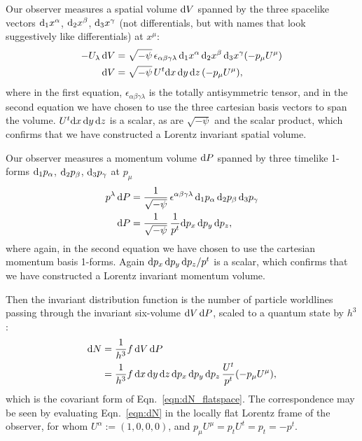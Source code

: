 Our observer measures a spatial
volume $\mathrm{d} V$ spanned by the three spacelike vectors
$\mathrm{d}_1x^\alpha$, $\mathrm{d}_2x^\beta$, $\mathrm{d}_3x^\gamma$
(not differentials, but with names that look suggestively like differentials)
at $x^\mu$:
\begin{align}
  \label{eqn:covariant_dV}
  -U_\lambda\,\mathrm{d} V &= \sqrt{-\psi} \, \epsilon_{\alpha\beta\gamma\lambda}\,
  \mathrm{d}_1x^\alpha\, \mathrm{d}_2x^\beta\, \mathrm{d}_3x^\gamma (-p_\mu U^\mu) \\
  \label{eqn:dV}
  \mathrm{d} V       &= \sqrt{-\psi} \, U^t \mathrm{d} x\,\mathrm{d} y\,\mathrm{d} z\, (-p_\mu U^\mu),
\end{align}
where in the first equation, $\epsilon_{\alpha\beta\gamma\lambda}$ is the
totally antisymmetric tensor, and in the second equation we have
chosen to use the three cartesian basis vectors to span the volume.
$U^t \mathrm{d} x\,\mathrm{d} y\,\mathrm{d} z$ is a scalar,
as are $\sqrt{-\psi}$ and the scalar product, which confirms that we have
constructed a Lorentz invariant spatial volume.

Our observer
measures a momentum volume $\mathrm{d} P$ spanned by three timelike 1-forms
$\mathrm{d}_1p_\alpha$, $\mathrm{d}_2p_\beta$, $\mathrm{d}_3p_\gamma$ at $p_\mu$
\begin{align}
  \label{eqn:covariant_dP}
  p^\lambda\, \mathrm{d} P &= \frac{1}{\sqrt{-\psi}} \, \epsilon^{\alpha\beta\gamma\lambda}\,
  \mathrm{d}_1p_\alpha\, \mathrm{d}_2p_\beta\, \mathrm{d}_3p_\gamma \\
  \label{eqn:dP}
  \mathrm{d} P &= \frac{1}{\sqrt{-\psi}} \, \frac{1}{p^t} \mathrm{d} p_x\, \mathrm{d} p_y\, \mathrm{d} p_z,
\end{align}
where again, in the second equation we have chosen to use the cartesian momentum
basis 1-forms.
Again $\mathrm{d} p_x\, \mathrm{d} p_y\, \mathrm{d} p_z/p^t$ is a scalar,
which confirms that we have
constructed a Lorentz invariant momentum volume.

Then the invariant distribution function is the number of particle worldlines
passing through the invariant six-volume $\mathrm{d} V\,\mathrm{d} P$, scaled to a quantum
state by $h^3$:
\begin{align}
  \label{eqn:dN_covariant}
  \mathrm{d} N &= \frac{1}{h^3} f\, \mathrm{d} V \, \mathrm{d} P\\
  \label{eqn:dN}
  &= \frac{1}{h^3} f\,
  \mathrm{d} x\,\mathrm{d} y\,\mathrm{d} z\, \mathrm{d} p_x\, \mathrm{d} p_y\, \mathrm{d} p_z\,
  \frac{U^t}{p^t} (-p_\mu U^\mu),
\end{align}
which is the covariant form of Eqn.~\ref{eqn:dN_flatspace}. The correspondence
may be seen by evaluating Eqn.~\ref{eqn:dN} in the locally flat Lorentz frame of
the observer, for whom $U^\alpha:=(1,0,0,0)$, and
$p_\mu U^\mu=p_tU^t=p_t=-p^t$.


